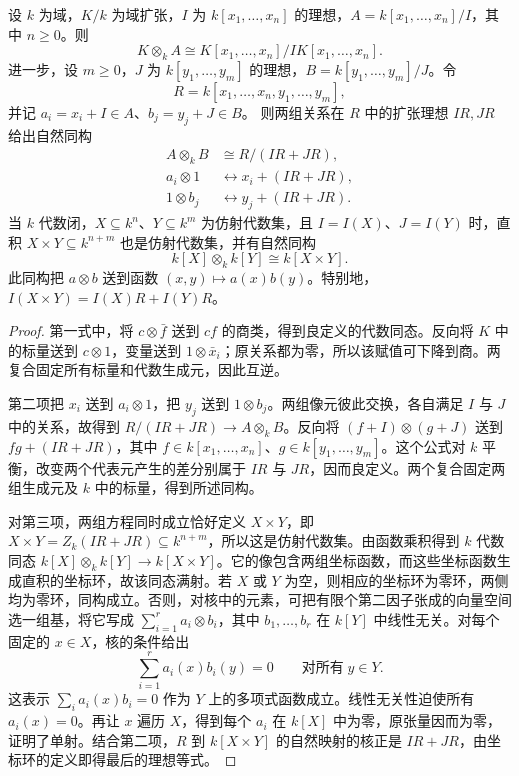\begin{proposition}\label{b3:prop:base-change-presentation}
	设 \(k\) 为域，\(K/k\) 为域扩张，\(I\) 为 \(k[x_1,\ldots,x_n]\) 的理想，\(A=k[x_1,\ldots,x_n]/I\)，其中 \(n\ge0\)。则
	\[
		K\otimes_kA\cong K[x_1,\ldots,x_n]/I K[x_1,\ldots,x_n].
	\]
	进一步，设 \(m\ge0\)，\(J\) 为 \(k[y_1,\ldots,y_m]\) 的理想，\(B=k[y_1,\ldots,y_m]/J\)。令
	\[
		R=k[x_1,\ldots,x_n,y_1,\ldots,y_m],
	\]
	并记 \(a_i=x_i+I\in A\)、\(b_j=y_j+J\in B\)。 则两组关系在 \(R\) 中的扩张理想 \(IR,JR\) 给出自然同构
	\[
		\begin{aligned}
			A\otimes_kB&\cong R/(IR+JR),\\
			a_i\otimes1&\longleftrightarrow x_i+(IR+JR),\\
			1\otimes b_j&\longleftrightarrow y_j+(IR+JR).
		\end{aligned}
	\]
	当 \(k\) 代数闭，\(X\subseteq k^n\)、\(Y\subseteq k^m\) 为仿射代数集，且 \(I=I(X)\)、\(J=I(Y)\) 时，直积 \(X\times Y\subseteq k^{n+m}\) 也是仿射代数集，并有自然同构
	\[
		k[X]\otimes_k k[Y]\cong k[X\times Y].
	\]
	此同构把 \(a\otimes b\) 送到函数 \((x,y)\mapsto a(x)b(y)\)。特别地，\(I(X\times Y)=I(X)R+I(Y)R\)。
\end{proposition}
\begin{proof}
	第一式中，将 \(c\otimes\bar f\) 送到 \(cf\) 的商类，得到良定义的代数同态。反向将 \(K\) 中的标量送到 \(c\otimes1\)，变量送到 \(1\otimes\bar x_i\)；原关系都为零，所以该赋值可下降到商。两复合固定所有标量和代数生成元，因此互逆。

	第二项把 \(x_i\) 送到 \(a_i\otimes1\)，把 \(y_j\) 送到 \(1\otimes b_j\)。两组像元彼此交换，各自满足 \(I\) 与 \(J\) 中的关系，故得到 \(R/(IR+JR)\to A\otimes_kB\)。反向将 \((f+I)\otimes(g+J)\) 送到 \(fg+(IR+JR)\)，其中 \(f\in k[x_1,\ldots,x_n]\)、\(g\in k[y_1,\ldots,y_m]\)。这个公式对 \(k\) 平衡，改变两个代表元产生的差分别属于 \(IR\) 与 \(JR\)，因而良定义。两个复合固定两组生成元及 \(k\) 中的标量，得到所述同构。

	对第三项，两组方程同时成立恰好定义 \(X\times Y\)，即 \(X\times Y=Z_k(IR+JR)\subseteq k^{n+m}\)，所以这是仿射代数集。由函数乘积得到 \(k\) 代数同态 \(k[X]\otimes_k k[Y]\to k[X\times Y]\)。它的像包含两组坐标函数，而这些坐标函数生成直积的坐标环，故该同态满射。若 \(X\) 或 \(Y\) 为空，则相应的坐标环为零环，两侧均为零环，同构成立。否则，对核中的元素，可把有限个第二因子张成的向量空间选一组基，将它写成 \(\sum_{i=1}^r a_i\otimes b_i\)，其中 \(b_1,\ldots,b_r\) 在 \(k[Y]\) 中线性无关。对每个固定的 \(x\in X\)，核的条件给出
	\[
		\sum_{i=1}^r a_i(x)b_i(y)=0\qquad\text{对所有}\;y\in Y.
	\]
	这表示 \(\sum_i a_i(x)b_i=0\) 作为 \(Y\) 上的多项式函数成立。线性无关性迫使所有 \(a_i(x)=0\)。再让 \(x\) 遍历 \(X\)，得到每个 \(a_i\) 在 \(k[X]\) 中为零，原张量因而为零，证明了单射。结合第二项，\(R\) 到 \(k[X\times Y]\) 的自然映射的核正是 \(IR+JR\)，由坐标环的定义即得最后的理想等式。
\end{proof}

